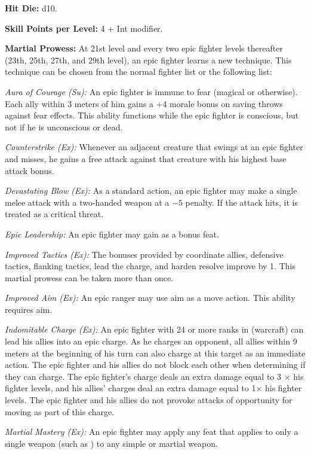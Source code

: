 \textbf{Hit Die:} d10.

\textbf{Skill Points per Level:} 4 + Int modifier.

\textbf{Martial Prowess:} At 21st level and every two epic fighter levels thereafter (23th, 25th, 27th, and 29th level), an epic fighter learns a new technique. This technique can be chosen from the normal fighter list or the following list:

\textit{Aura of Courage (Su):} An epic fighter is immune to fear (magical or otherwise). Each ally within 3 meters of him gains a +4 morale bonus on saving throws against fear effects. This ability functions while the epic fighter is conscious, but not if he is unconscious or dead.

\textit{Counterstrike (Ex):} Whenever an adjacent creature that swings at an epic fighter and misses, he gains a free attack against that creature with his highest base attack bonus.

\textit{Devastating Blow (Ex):} As a standard action, an epic fighter may make a single melee attack with a two-handed weapon at a $-5$ penalty. If the attack hits, it is treated as a critical threat.

\textit{Epic Leadership:} An epic fighter may gain  as a bonus feat.

\textit{Improved Tactics (Ex):} The bonuses provided by coordinate allies, defensive tactics, flanking tactics, lead the charge, and harden resolve improve by 1. This martial prowess can be taken more than once.

\textit{Improved Aim (Ex):} An epic ranger may use aim as a move action. This ability requires aim.

\textit{Indomitable Charge (Ex):} An epic fighter with 24 or more ranks in  (warcraft) can lead his allies into an epic charge. As he charges an opponent, all allies within 9 meters at the beginning of his turn can also charge at this target as an immediate action. The epic fighter and his allies do not block each other when determining if they can charge. The epic fighter's charge deals an extra damage equal to 3 $\times$ his fighter levels, and his allies' charges deal an extra damage equal to 1\onehalf $\times$ his fighter levels. The epic fighter and his allies do not provoke attacks of opportunity for moving as part of this charge.

\textit{Martial Mastery (Ex):} An epic fighter may apply any feat that applies to only a single weapon (such as ) to any simple or martial weapon.

